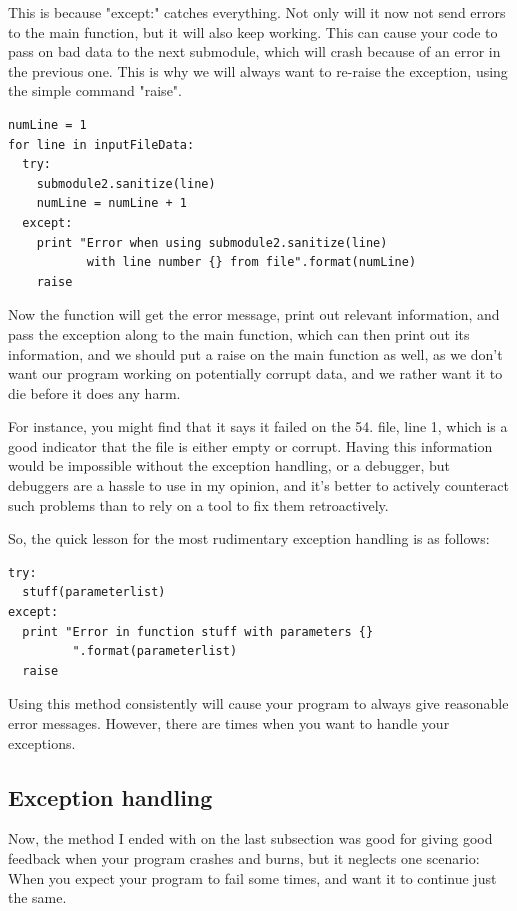\documentclass[10pt,a4paper]{article}
\begin{document}
This is because "except:" catches everything. Not only will it now not send errors to the main function, but it will also keep working. This can cause your code to pass on bad data to the next submodule, which will crash because of an error in the previous one. This is why we will always want to re-raise the exception, using the simple command "raise".


\begin{lstlisting}
numLine = 1
for line in inputFileData:
  try: 
    submodule2.sanitize(line)
    numLine = numLine + 1
  except:
    print "Error when using submodule2.sanitize(line) 
           with line number {} from file".format(numLine)
    raise

\end{lstlisting}

Now the function will get the error message, print out relevant information, and pass the exception along to the main function, which can then print out its information, and we should put a raise on the main function as well, as we don't want our program working on potentially corrupt data, and we rather want it to die before it does any harm. 

For instance, you might find that it says it failed on the 54. file, line 1, which is a good indicator that the file is either empty or corrupt. Having this information would be impossible without the exception handling, or a debugger, but debuggers are a hassle to use in my opinion, and it's better to actively counteract such problems than to rely on a tool to fix them retroactively.

So, the quick lesson for the most rudimentary exception handling is as follows:

\begin{lstlisting}
try: 
  stuff(parameterlist)
except:
  print "Error in function stuff with parameters {} 
         ".format(parameterlist) 
  raise
\end{lstlisting}

Using this method consistently will cause your program to always give reasonable error messages. However, there are times when you want to handle your exceptions.

\subsection{Exception handling}

Now, the method I ended with on the last subsection was good for giving good feedback when your program crashes and burns, but it neglects one scenario: When you expect your program to fail some times, and want it to continue just the same. 
\end{document}
